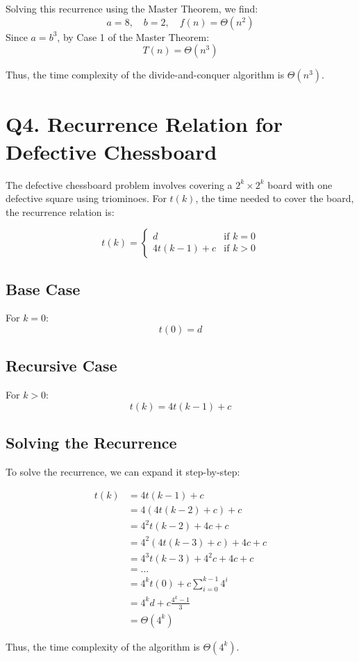 \documentclass{article}
\begin{document}
Solving this recurrence using the Master Theorem, we find:
\[
    a = 8, \quad b = 2, \quad f(n) = \Theta(n^2)
\]
Since \(a = b^3\), by Case 1 of the Master Theorem:
\[
    T(n) = \Theta(n^3)
\]

Thus, the time complexity of the divide-and-conquer algorithm is \(\Theta(n^3)\).

\section{Q4. Recurrence Relation for Defective Chessboard}
The defective chessboard problem involves covering a \(2^k \times 2^k\) board with one defective square using triominoes. For \( t(k) \), the time needed to cover the board, the recurrence relation is:

\[
    t(k) =
    \begin{cases}
        d           & \text{if } k = 0 \\
        4t(k-1) + c & \text{if } k > 0
    \end{cases}
\]

\subsection*{Base Case}
For \( k = 0 \):
\[
    t(0) = d
\]

\subsection*{Recursive Case}
For \( k > 0 \):
\[
    t(k) = 4t(k-1) + c
\]

\subsection*{Solving the Recurrence}
To solve the recurrence, we can expand it step-by-step:

\begin{align*}
    t(k) & = 4t(k-1) + c                       \\
         & = 4(4t(k-2) + c) + c                \\
         & = 4^2 t(k-2) + 4c + c               \\
         & = 4^2 (4t(k-3) + c) + 4c + c        \\
         & = 4^3 t(k-3) + 4^2 c + 4c + c       \\
         & = \ldots                            \\
         & = 4^k t(0) + c \sum_{i=0}^{k-1} 4^i \\
         & = 4^k d + c \frac{4^k - 1}{3}       \\
         & = \Theta(4^k)
\end{align*}

Thus, the time complexity of the algorithm is \(\Theta(4^k)\).
\end{document}
